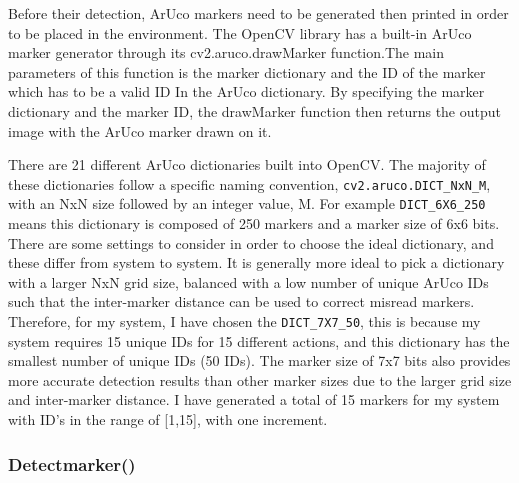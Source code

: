 \documentclass[oneside,%
                    author={Malak Hajji},
                    degree={BSc},
                    title={Designing An Accessible Computational Toolkit For Students},
                  subtitle={With Mixed Visual Abilities}]{dissertation}
\begin{document}
Before their detection, ArUco markers need to be generated then printed in order to be placed in the environment. The OpenCV library has a built-in ArUco marker generator through its 
cv2.aruco.drawMarker function.The main parameters of this function is the marker dictionary  and the ID of the marker which has to be a valid ID In the ArUco dictionary. By specifying the marker dictionary and the marker ID, the drawMarker function then returns the output image with the ArUco marker drawn on it. 

There are 21 different ArUco dictionaries built into OpenCV. The majority of these dictionaries follow a specific naming convention, \texttt{cv2.aruco.DICT\_NxN\_M}, with an NxN size followed by an integer value, M. For example \texttt{DICT\_6X6\_250} means this dictionary is composed of 250 markers and a marker size of 6x6 bits. There are some settings to consider in order to choose the ideal dictionary, and these differ from system to system. It is generally more ideal to pick a dictionary with a larger NxN grid size, balanced with a low number of unique ArUco IDs such that the inter-marker distance can be used to correct misread markers. 
Therefore, for my system, I have chosen the \texttt{DICT\_7X7\_50}, this is because my system requires 15 unique IDs for 15 different actions, and this dictionary has the smallest number of unique IDs (50 IDs). The marker size of 7x7 bits also provides more accurate detection results than other marker sizes due to the larger grid size and inter-marker distance. 
I have generated a total of 15 markers for my system with ID’s in the range of [1,15], with one increment. 

\subsubsection{Detectmarker()}
\end{document}
